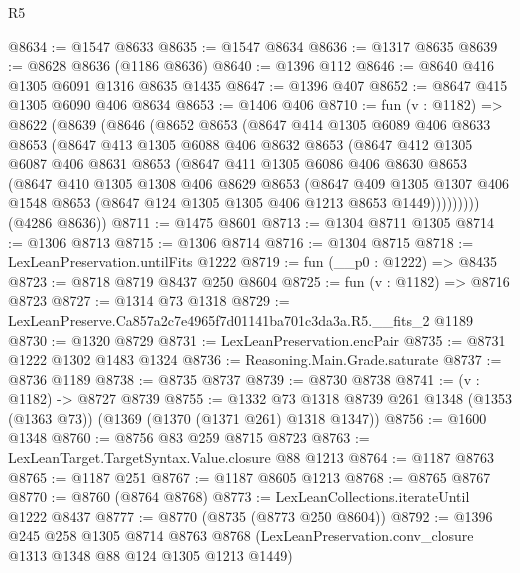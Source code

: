 \begin{lexlean}{R5}
\begin{coremodule}
@8634 := @1547 @8633
@8635 := @1547 @8634
@8636 := @1317 @8635
@8639 := @8628 @8636 (@1186 @8636)
@8640 := @1396 @112
@8646 := @8640 @416 @1305 @6091 @1316 @8635 @1435
@8647 := @1396 @407
@8652 := @8647 @415 @1305 @6090 @406 @8634
@8653 := @1406 @406
@8710 := fun (v : @1182) =>
  @8622
    (@8639
      (@8646
        (@8652
          @8653
          (@8647
            @414
            @1305
            @6089
            @406
            @8633
            @8653
            (@8647
              @413
              @1305
              @6088
              @406
              @8632
              @8653
              (@8647
                @412
                @1305
                @6087
                @406
                @8631
                @8653
                (@8647
                  @411
                  @1305
                  @6086
                  @406
                  @8630
                  @8653
                  (@8647
                    @410
                    @1305
                    @1308
                    @406
                    @8629
                    @8653
                    (@8647
                      @409
                      @1305
                      @1307
                      @406
                      @1548
                      @8653
                      (@8647 @124 @1305 @1305 @406 @1213 @8653 @1449)))))))))
      (@4286 @8636))
@8711 := @1475 @8601
@8713 := @1304 @8711 @1305
@8714 := @1306 @8713
@8715 := @1306 @8714
@8716 := @1304 @8715
@8718 := LexLeanPreservation.untilFits @1222
@8719 := fun (__p0 : @1222) => @8435
@8723 := @8718 @8719 @8437 @250 @8604
@8725 := fun (v : @1182) => @8716 @8723
@8727 := @1314 @73 @1318
@8729 := LexLeanPreserve.Ca857a2c7e4965f7d01141ba701c3da3a.R5.__fits_2 @1189
@8730 := @1320 @8729
@8731 := LexLeanPreservation.encPair
@8735 := @8731 @1222 @1302 @1483 @1324
@8736 := Reasoning.Main.Grade.saturate
@8737 := @8736 @1189
@8738 := @8735 @8737
@8739 := @8730 @8738
@8741 := (v : @1182) -> @8727 @8739
@8755 := @1332
    @73
    @1318
    @8739
    @261
    @1348
    (@1353 (@1363 @73))
    (@1369 (@1370 (@1371 @261) @1318 @1347))
@8756 := @1600 @1348
@8760 := @8756 @83 @259 @8715 @8723
@8763 := LexLeanTarget.TargetSyntax.Value.closure @88 @1213
@8764 := @1187 @8763
@8765 := @1187 @251
@8767 := @1187 @8605 @1213
@8768 := @8765 @8767
@8770 := @8760 (@8764 @8768)
@8773 := LexLeanCollections.iterateUntil @1222 @8437
@8777 := @8770 (@8735 (@8773 @250 @8604))
@8792 := @1396
    @245
    @258
    @1305
    @8714
    @8763
    @8768
    (LexLeanPreservation.conv_closure @1313 @1348 @88 @124 @1305 @1213 @1449)

\end{coremodule}
\end{lexlean}
